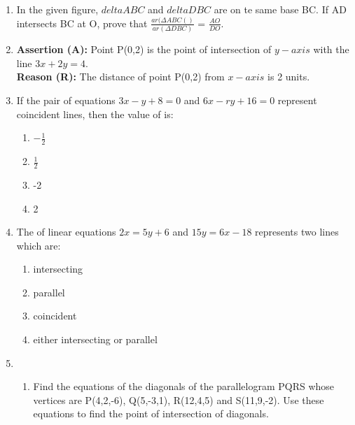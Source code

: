 \documentclass{article}
\begin{document}
\begin{enumerate}
	\item In the given figure, $deltaABC$ and $deltaDBC$ are on te same base BC. If AD intersects BC at O, prove that $\frac {ar (\Delta ABC()}{ar (\Delta DBC)}$ = $\frac{AO}{DO}$.

		\begin{center}
		\end{center}

	\item \textbf{Assertion (A):} Point P(0,2) is the point of intersection of $y-axis$ with  the line $3x+2y=4$.\\
		\textbf{Reason (R):} The distance of point P(0,2) from $x-axis$ is 2 units.

	\item If the pair of equations $3x-y+8=0$ and $6x-ry+16=0$ represent coincident lines, then the value of  is:

		\begin{enumerate}
			\item $-\frac{1}{2}$
			\item $\frac{1}{2}$
			\item -2
			\item 2
		\end{enumerate}

	\item The of linear equations $2x=5y+6$ and $15y=6x-18$ represents two lines which are:

			\begin{enumerate}
				\item intersecting
				\item parallel
				\item coincident
				\item either intersecting or parallel
			\end{enumerate}

	\item 
		\begin{enumerate}
		\item Find the equations of the diagonals of the parallelogram PQRS whose vertices are P(4,2,-6), Q(5,-3,1), R(12,4,5) and S(11,9,-2). Use these equations to find the point of intersection of diagonals.


\end{enumerate}
\end{enumerate}
\end{document}
